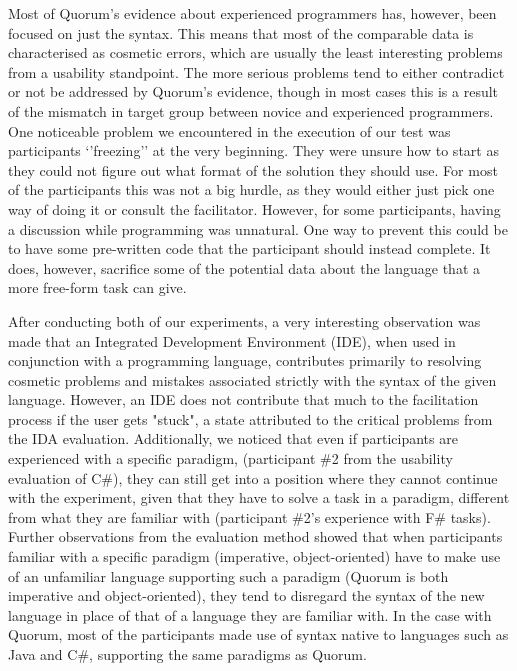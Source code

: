 \documentclass[10pt]{sigplanconf}
\begin{document}
Most of Quorum's evidence about experienced programmers has, however, been focused on just the syntax.
This means that most of the comparable data is characterised as cosmetic errors, which are usually the least interesting problems from a usability standpoint.
The more serious problems tend to either contradict or not be addressed by Quorum's evidence, though in most cases this is a result of the mismatch in target group between novice and experienced programmers.
One noticeable problem we encountered in the execution of our test was participants `'freezing'' at the very beginning.
They were unsure how to start as they could not figure out what format of the solution they should use.
For most of the participants this was not a big hurdle, as they would either just pick one way of doing it or consult the facilitator.
However, for some participants, having a discussion while programming was unnatural.
One way to prevent this could be to have some pre-written code that the participant should instead complete.
It does, however, sacrifice some of the potential data about the language that a more free-form task can give.

After conducting both of our experiments, a very interesting observation was made that an Integrated Development Environment (IDE), when used in conjunction with a programming language, contributes primarily to resolving cosmetic problems and mistakes associated strictly with the syntax of the given language. However, an IDE does not contribute that much to the facilitation process if the user gets "stuck", a state attributed to the critical problems from the IDA evaluation. Additionally, we noticed that even if participants are experienced with a specific paradigm, (participant \#2 from the usability evaluation of C\#), 
they can still get into a position where they cannot continue with the experiment, given that they have to solve a task in a paradigm, different from what they are familiar with (participant \#2's experience with F\# tasks). Further observations from the evaluation method showed that when participants familiar with a specific paradigm (imperative, object-oriented) have to make use of an unfamiliar language supporting such a paradigm (Quorum is both imperative and object-oriented), they tend to disregard the syntax of the new language in place of that of a language they are familiar with. In the case with Quorum, most of the participants %
made use of syntax native to languages such as Java and C\#, supporting the same paradigms as Quorum.
\end{document}

